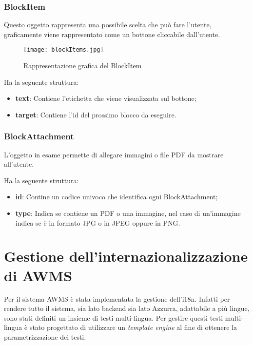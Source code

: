 \subsubsection*{BlockItem}
Questo oggetto rappresenta una possibile scelta che può fare l'utente, graficamente viene rappresentato come un bottone cliccabile dall'utente.

\begin{figure}[h]
	\centering
	\texttt{[image: blockItems.jpg]}
	\caption{Rappresentazione grafica del BlockItem}
\end{figure}
Ha la seguente struttura:

\begin{itemize}
	\item \textbf{text}: Contiene l'etichetta che viene visualizzata sul bottone;
	\item \textbf{target}: Contiene l'id del prossimo blocco da eseguire.
\end{itemize}



\subsubsection*{BlockAttachment} 
L'oggetto in esame permette di allegare immagini o file PDF da mostrare all'utente.

Ha la seguente struttura:

\begin{itemize}
	\item \textbf{id}: Contine un codice univoco che identifica ogni BlockAttachment;
	\item \textbf{type}: Indica se contiene un PDF o una immagine, nel caso di un'immagine indica se è in formato JPG o in JPEG oppure in PNG.
\end{itemize}	

\section{Gestione dell'internazionalizzazione di AWMS}
Per il sistema \gls{AWMS} è stata implementata la gestione dell'\gls{i18n}. Infatti per rendere tutto il sistema, sia lato backend sia lato Azzurra, adattabile a più lingue, sono stati definiti un insieme di testi multi-lingua. Per gestire questi testi multi-lingua è stato progettato di utilizzare un \emph{template engine} al fine di ottenere la parametrizzazione dei testi. \\

